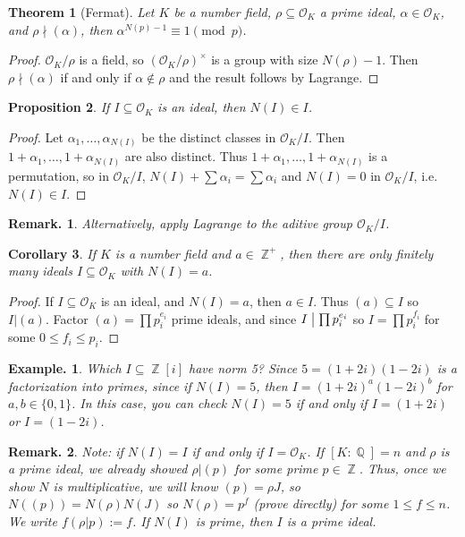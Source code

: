 \documentclass[11pt, a4paper]{memoir}
\DeclareMathOperator{\Q}{{\mathbb{Q}}}
\DeclareMathOperator{\Z}{{\mathbb{Z}}}
\renewcommand{\div}{\bigm|}
\theoremstyle{change}
\newtheorem{theorem}{Theorem}[section]
\newtheorem{corollary}[theorem]{Corollary}
\newtheorem{proposition}[theorem]{Proposition}
\theoremstyle{plain}
\theoremstyle{nonumberplain}
\newtheorem{example}{Example.}
\newtheorem{remark}{Remark.}
\newtheorem{proof}{Proof}
\begin{document}
\begin{theorem}[Fermat]
    Let $K$ be a number field, $\rho\subseteq\mathcal{O}_K$ a prime ideal, $\alpha\in\mathcal{O}_K$, and $\rho\nmid(\alpha)$, then $\alpha^{N(p)-1}\equiv 1\pmod{p}$.
\end{theorem}
\begin{proof}
    $\mathcal{O}_K/\rho$ is a field, so $(\mathcal{O}_K/\rho)^\times$ is a group with size $N(\rho)-1$.
    Then $\rho\nmid(\alpha)$ if and only if $\alpha\notin\rho$ and the result follows by Lagrange.
\end{proof}
\begin{proposition}
    If $I\subseteq\mathcal{O}_K$ is an ideal, then $N(I)\in I$.
\end{proposition}
\begin{proof}
    Let $\alpha_1,\ldots,\alpha_{N(I)}$ be the distinct classes in $\mathcal{O}_K/I$.
    Then $1+\alpha_1,\ldots,1+\alpha_{N(I)}$ are also distinct.
    Thus $1+\alpha_1,\ldots,1+\alpha_{N(I)}$ is a permutation, so in $\mathcal{O}_K/I$, $N(I)+\sum\alpha_i=\sum\alpha_i$ and $N(I)=0$ in $\mathcal{O}_K/I$, i.e. $N(I)\in I$.
\end{proof}
\begin{remark}
    Alternatively, apply Lagrange to the aditive group $\mathcal{O}_K/I$.
\end{remark}
\begin{corollary}
    If $K$ is a number field and $a\in\Z^+$, then there are only finitely many ideals $I\subseteq\mathcal{O}_K$ with $N(I)=a$.
\end{corollary}
\begin{proof}
    If $I\subseteq\mathcal{O}_K$ is an ideal, and $N(I)=a$, then $a\in I$.
    Thus $(a)\subseteq I$ so $I|(a)$.
    Factor $(a)=\prod p_i^{e_i}$ prime ideals, and since $I\div\prod p_i^{e_i}$ so $I=\prod p_i^{f_i}$ for some $0\leq f_i\leq p_i$.
\end{proof}
\begin{example}
    Which $I\subseteq\Z[i]$ have norm 5?
    Since $5=(1+2i)(1-2i)$ is a factorization into primes, since if $N(I)=5$, then $I=(1+2i)^a(1-2i)^b$ for $a,b\in\{0,1\}$.
    In this case, you can check $N(I)=5$ if and only if $I=(1+2i)$ or $I=(1-2i)$.
\end{example}
\begin{remark}
    Note: if $N(I)=I$ if and only if $I=\mathcal{O}_K$.
    If $[K:\Q]=n$ and $\rho$ is a prime ideal, we already showed $\rho|(p)$ for some prime $p\in\Z$.
    Thus, once we show $N$ is multiplicative, we will know $(p)=\rho J$, so $N((p))=N(\rho)N(J)$ so $N(\rho)=p^f$ (prove directly) for some $1\leq f\leq n$.
    We write $f(\rho|p):=f$.
    If $N(I)$ is prime, then $I$ is a prime ideal.
\end{remark}
\end{document}
